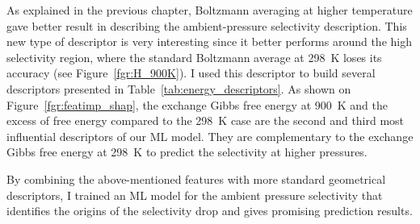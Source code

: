 \documentclass[main]{subfiles}
\begin{document}
As explained in the previous chapter, Boltzmann averaging at higher temperature gave better result in describing the ambient-pressure selectivity description. 
This new type of descriptor is very interesting since it better performs around the high selectivity region, where the standard Boltzmann average at \SI{298}{\kelvin} loses its accuracy (see Figure~\ref{fgr:H_900K}). I used this descriptor to build several descriptors presented in Table~\ref{tab:energy_descriptors}. As shown on Figure~\ref{fgr:featimp_shap}, the exchange Gibbs free energy at \SI{900}{\kelvin} and the excess of free energy compared to the \SI{298}{\kelvin} case are the second and third most influential descriptors of our ML model. They are complementary to the exchange Gibbs free energy at \SI{298}{\kelvin} to predict the selectivity at higher pressures.

By combining the above-mentioned features with more standard geometrical descriptors, I trained an ML model for the ambient pressure selectivity that identifies the origins of the selectivity drop and gives promising prediction results.

\clearpage
\end{document}
